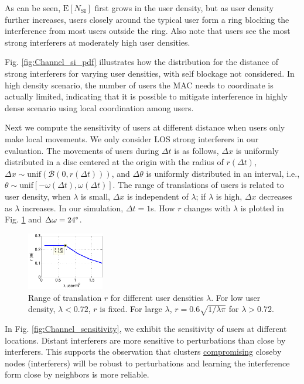 \documentclass[10pt, conference, letterpaper]{IEEEtran}
\begin{document}
As can be seen, $\mathrm{E}[N_{\mathrm{SI}}]$ first grows in the user density, but as user density further increases, users closely around the typical user form a ring blocking the interference from most users outside the ring. Also note that users see the most strong interferers at moderately high user densities. 

Fig. \ref{fig:Channel_si_pdf} illustrates how the distribution for the distance of strong interferers for varying user densities, with self blockage not considered. In high density scenario, the number of users the MAC needs to coordinate is actually limited, indicating that it is possible to mitigate interference in highly dense scenario using local coordination among users.

Next we compute the sensitivity of users at different distance when users only make local movements. We only consider LOS strong interferers in our evaluation. The movements of users during $\Delta t$ is as follows, $\Delta x$ is uniformly distributed in a disc centered at the origin with the radius of $r(\Delta t)$, $\Delta x \sim \mathrm{unif}(\mathcal{B}(0, r(\Delta t)))$, and $\Delta \theta$ is uniformly distributed in an interval, i.e., $\theta \sim \mathrm{unif}[-\omega(\Delta t), \omega(\Delta t)]$. The range of translations of users is related to user density, when $\lambda$ is small, $\Delta x$ is independent of $\lambda$; if $\lambda$ is high, $\Delta x$ decreases as $\lambda$ increases. In our simulation, $\Delta t = 1$s. How $r$ changes with $\lambda$ is plotted in Fig. \ref{fig:Channel_translation_range} and $\Delta \omega = 24\degree$.

\begin{figure}
	\centering
	\includegraphics[width = 0.3\textwidth]{Channel_translation_range.pdf}
	\caption{Range of translation $r$ for different user densities $\lambda$. For low user density, $\lambda<0.72$, $r$ is fixed. For large $\lambda$, $r = 0.6 \sqrt{1/\lambda\pi}$ for $\lambda >0.72$.}
	\label{fig:Channel_translation_range}
\end{figure}

In Fig. \ref{fig:Channel_sensitivity}, we exhibit the sensitivity of users at different locations. Distant interferers are more sensitive to perturbations than close by interferers. This supports the observation that clusters \underline{compromising} closeby nodes (interferers) will be robust to perturbations and learning the interference form close by neighbors is more reliable. 
\end{document}
